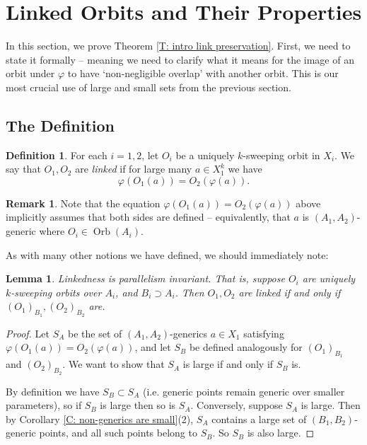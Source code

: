 \documentclass{amsart}
\newtheorem{lemma}[theorem]{Lemma}
\theoremstyle{definition}
\newtheorem{definition}[theorem]{Definition}
\newtheorem{remark}[theorem]{Remark}
\begin{document}
\section{Linked Orbits and Their Properties}

In this section, we prove Theorem \ref{T: intro link preservation}. First, we need to state it formally -- meaning we need to clarify what it means for the image of an orbit under $\varphi$ to have `non-negligible overlap' with another orbit. This is our most crucial use of large and small sets from the previous section.

\subsection{The Definition}

\begin{definition}\label{D: linked} For each $i=1,2$, let $O_i$ be a uniquely $k$-sweeping orbit in $X_i$. We say that $O_1,O_2$ are \textit{linked} if for large many $a\in X_1^k$ we have $$\varphi(O_1(a))=O_2(\varphi(a)).$$
\end{definition}

\begin{remark} Note that the equation $\varphi(O_1(a))=O_2(\varphi(a))$ above implicitly assumes that both sides are defined -- equivalently, that $a$ is $(A_1,A_2)$-generic where $O_i\in\operatorname{Orb}(A_i)$.
\end{remark}

As with many other notions we have defined, we should immediately note:

\begin{lemma}\label{L: linked invariant}
    Linkedness is parallelism invariant. That is, suppose $O_i$ are uniquely $k$-sweeping orbits over $A_i$, and $B_i\supset A_i$. Then $O_1,O_2$ are linked if and only if $(O_1)_{B_1},(O_2)_{B_2}$ are.
\end{lemma}
\begin{proof}
    Let $S_A$ be the set of $(A_1,A_2)$-generics $a\in X_1$ satisfying $\varphi(O_1(a))=O_2(\varphi(a))$, and let $S_B$ be defined analogously for $(O_1)_{B_1}$ and $(O_2)_{B_2}$. We want to show that $S_A$ is large if and only if $S_B$ is.

    By definition we have $S_B\subset S_A$ (i.e. generic points remain generic over smaller parameters), so if $S_B$ is large then so is $S_A$. Conversely, suppose $S_A$ is large. Then by Corollary \ref{C: non-generics are small}(2), $S_A$ contains a large set of $(B_1,B_2)$-generic points, and all such points belong to $S_B$. So $S_B$ is also large.
\end{proof}
\end{document}
